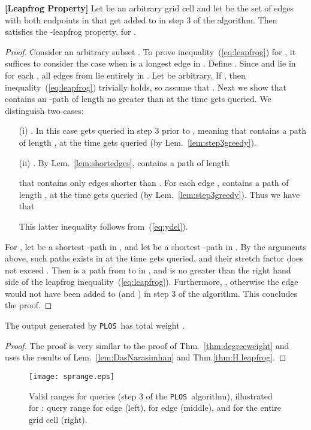 \documentclass{llncs}
\newcommand{\ABox}{
\raisebox{3pt}{\framebox[6pt]{\rule{6pt}{0pt}}}
}
\newcommand{\palg}{{\tt PLOS}}
\begin{document}
\begin{theorem} {\bf [Leapfrog Property]}
Let  be an arbitrary grid cell and let  be the set of edges with both
endpoints in  that get added to  in step 3 of
the algorithm.
Then  satisfies the -leapfrog property, for .
\label{thm:H.leapfrog}
\end{theorem}
\begin{proof}
Consider an arbitrary subset . To prove
inequality~(\ref{eq:leapfrog}) for , it suffices to consider the
case when  is a longest edge in .
Define . Since
 and  lie in  for each , all edges from  lie entirely in .
Let  be arbitrary. If , then
inequality~(\ref{eq:leapfrog}) trivially holds, so assume that .
Next we show that  contains an -path of length no greater than 
at the time  gets queried.
We distinguish two cases:
\begin{itemize}
\item [(i)] . In this case  gets queried in step 3 prior to ,
meaning that  contains a path  of length , at the
time  gets queried (by Lem.~\ref{lem:step3greedy}).
\item[(ii)] . By Lem.~\ref{lem:shortedges},  contains a path 
of length

that contains only edges shorter than . For each edge ,  contains a path  of length , at the time  gets queried (by Lem.~\ref{lem:step3greedy}). Thus we have that

This latter inequality follows from~(\ref{eq:ydel}).
\end{itemize}
For , let  be a shortest -path in , and let  be a shortest -path in . By the arguments above, such paths exists in  at the time  gets queried, and their stretch factor does not exceed . Then  is a path from  to  in , and  is no greater than the right hand side of the leapfrog inequality~(\ref{eq:leapfrog}).
Furthermore, , otherwise the edge  would not have been added to  (and ) in step 3 of the algorithm. This concludes the proof. \hfill\ABox
\end{proof}

\begin{theorem}
The output  generated by \palg\ has total weight .
\label{thm:pweight}
\end{theorem}
\begin{proof}
The proof is very similar to the proof of Thm.~\ref{thm:degreeweight} and uses the results of
Lem.~\ref{lem:DasNarasimhan} and Thm.\ref{thm:H.leapfrog}. \hfill\ABox
\end{proof}

\begin{figure}[htbp]
\centering
\texttt{[image: sprange.eps]}
\caption{Valid ranges for  queries (step 3 of the \palg\ algorithm), illustrated for : query range for edge  (left), for edge  (middle), and for the entire grid cell  (right).}
\label{fig:sprange}
\end{figure}
\end{document}
